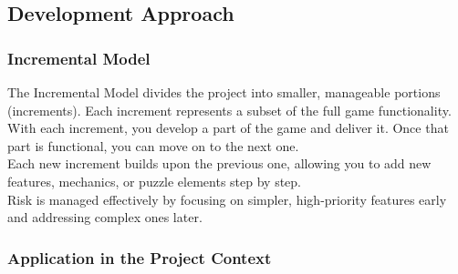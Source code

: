 \documentclass[11pt, a4paper]{article}
\begin{document}
\newpage

\subsection{Development Approach}

\subsubsection{Incremental Model}

\noindent The Incremental Model divides the project into smaller, manageable portions (increments). Each increment represents a subset of the full game functionality. \\

\noindent With each increment, you develop a part of the game and deliver it. Once that part is functional, you can move on to the next one. \\

\noindent Each new increment builds upon the previous one, allowing you to add new features, mechanics, or puzzle elements step by step. \\

\noindent Risk is managed effectively by focusing on simpler, high-priority features early and addressing complex ones later.

\subsubsection{Application in the Project Context}
\end{document}
